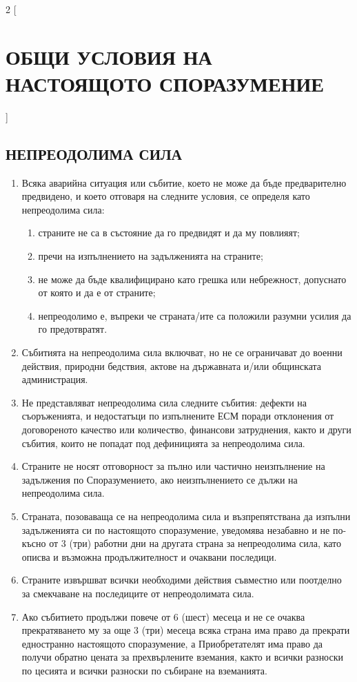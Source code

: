 \begin{multicols}{2} [\section{ОБЩИ УСЛОВИЯ НА НАСТОЯЩОТО
    СПОРАЗУМЕНИЕ}]
  \subsection{НЕПРЕОДОЛИМА СИЛА}
  \begin{enumerate}
  \item Всяка аварийна ситуация или събитие, което не може да бъде
    предварително предвидено, и което отговаря на следните условия, се
    определя като непреодолима сила:
    \begin{enumerate}
    \item страните не са в състояние да го предвидят и да му повлияят;
    \item пречи на изпълнението на задълженията на страните;
    \item не може да бъде квалифицирано като грешка или небрежност,
      допуснато от която и да е от страните;
    \item непреодолимо е, въпреки че страната/ите са положили разумни
      усилия да го предотвратят.
    \end{enumerate}
  \item Събитията на непреодолима сила включват, но не се ограничават
    до военни действия, природни бедствия, актове на държавната и/или
    общинската администрация.
  \item Не представляват непреодолима сила следните събития: дефекти
    на съоръженията, и недостатъци по изпълнените ЕСМ поради
    отклонения от договореното качество или количество, финансови
    затруднения, както и други събития, които не попадат под
    дефиницията за непреодолима сила.
  \item Страните не носят отговорност за пълно или частично
    неизпълнение на задължения по Споразумението, ако неизпълнението
    се дължи на непреодолима сила.
  \item Страната, позоваваща се на непреодолима сила и възпрепятствана
    да изпълни задълженията си по настоящото споразумение, уведомява
    незабавно и не по-късно от 3 (три) работни дни на другата страна
    за непреодолима сила, като описва и възможна продължителност и
    очаквани последици.
  \item Страните извършват всички необходими действия съвместно или
    поотделно за смекчаване на последиците от непреодолимата сила.
  \item Ако събитието продължи повече от 6 (шест) месеца и не се
    очаква прекратяването му за още 3 (три) месеца всяка страна има
    право да прекрати едностранно настоящото споразумение, а
    Приобретателят има право да получи обратно цената за прехвърлените
    вземания, както и всички разноски по цесията и всички разноски по
    събиране на вземанията.
  \end{enumerate}


\end{multicols}
